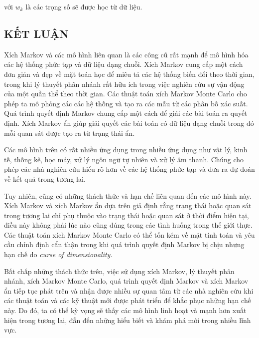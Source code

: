 \documentclass[14pt, a4paper]{article}
\numberwithin{equation}{section}
\numberwithin{figure}{section}
\theoremstyle{sltheorem}
\theoremstyle{soltheorem}
\numberwithin{dl}{section}
\numberwithin{md}{section}
\numberwithin{vd}{section}
\begin{document}
    với $w_k$ là các trọng số sẽ được học từ dữ liệu.

    \newpage
    \begin{center}
        \section*{KẾT LUẬN}
    \end{center}

    Xích Markov và các mô hình liên quan là các công cũ rất mạnh để mô hình hóa các hệ thống phức tạp và dữ liệu dạng chuỗi.
    Xích Markov cung cấp một cách đơn giản và đẹp về mặt toán học để miêu tả các hệ thống biến đổi theo thời gian, trong khi lý thuyết phân nhánh rất hữu ích trong việc nghiên cứu sự vận động của một quần thể theo thời gian.
    Các thuật toán xích Markov Monte Carlo cho phép ta mô phỏng các các hệ thống và tạo ra các mẫu từ các phân bố xác suất.
    Quá trình quyết định Markov chung cấp một cách để giải các bài toán ra quyết định.
    Xích Markov ẩn giúp giải quyết các bài toán có dữ liệu dạng chuỗi trong đó mỗi quan sát được tạo ra từ trạng thái ẩn.

    Các mô hình trên có rất nhiều ứng dụng trong nhiều ứng dụng như vật lý, kinh tế, thống kê, học máy, xử lý ngôn ngữ tự nhiên và xử lý âm thanh.
    Chúng cho phép các nhà nghiên cứu hiểu rõ hơn về các hệ thống phức tạp và đưa ra dự đoán về kết quả trong tương lai.

    Tuy nhiên, cũng có những thách thức và hạn chế liên quan đến các mô hình này.
    Xích Markov và xích Markov ẩn dựa trên giả định rằng trạng thái hoặc quan sát trong tương lai chỉ phụ thuộc vào trạng thái hoặc quan sát ở thời điểm hiện tại, điều này không phải lúc nào cũng đúng trong các tình huống trong thế giới thực.
    Các thuật toán xích Markov Monte Carlo có thể tốn kém về mặt tính toán và yêu cầu chỉnh định cẩn thận trong khi quá trình quyết định Markov bị chịu nhưng hạn chế do \textit{curse of dimensionality}.

    Bất chấp những thách thức trên, việc sử dụng xích Markov, lý thuyết phân nhánh, xích Markov Monte Carlo, quá trình quyết định Markov và xích Markov ẩn tiếp tục phát trên và nhận được nhiều sự quan tâm từ các nhà nghiên cứu khi các thuật toán và các kỹ thuật mới được phát triển để khắc phục những hạn chế này.
    Do đó, ta có thể kỳ vọng sẽ thấy các mô hình linh hoạt và mạnh hơn xuất hiện trong tương lai, đẫn đến những hiểu biết và khám phá mới trong nhiều lĩnh vực.


    \newpage
    \printbibliography[title={TÀI LIỆU THAM KHẢO}]
\end{document}
